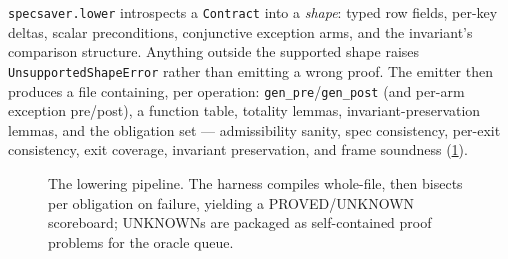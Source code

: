 \documentclass[11pt,a4paper]{article}
\begin{document}
\texttt{specsaver.lower} introspects a \texttt{Contract} into a
\emph{shape}: typed row fields, per-key deltas, scalar preconditions,
conjunctive exception arms, and the invariant's comparison structure.
Anything outside the supported shape raises
\texttt{UnsupportedShapeError} rather than emitting a wrong proof.
The emitter then produces a file containing, per operation:
\texttt{gen\_pre}/\texttt{gen\_post} (and per-arm exception
pre/post), a function table, totality lemmas, invariant-preservation
lemmas, and the obligation set --- admissibility sanity, spec
consistency, per-exit consistency, exit coverage, invariant
preservation, and frame soundness (\cref{fig:lowering}).

\begin{figure}[t]
\centering
{}
\caption{The lowering pipeline.  The harness compiles whole-file, then
bisects per obligation on failure, yielding a PROVED/UNKNOWN
scoreboard; UNKNOWNs are packaged as self-contained proof problems for
the oracle queue.}
\label{fig:lowering}
\end{figure}
\end{document}
